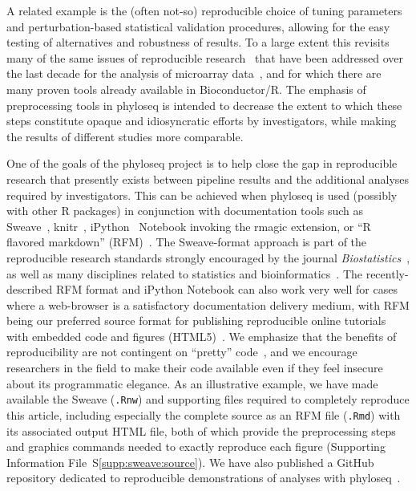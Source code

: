 \documentclass[10pt]{article}\usepackage{graphicx, color}
\newcommand{\R}{{\textsf{R}}}
\newcommand{\code}[1]{{\texttt{#1}}}
\begin{document}
A related example is the (often not-so) reproducible choice of tuning parameters
and perturbation-based statistical validation procedures,
allowing for the easy testing of alternatives and robustness of results.
To a large extent this revisits many of the same issues
of reproducible research~\cite{Donoho:2010cx,Peng:2009jy,Gentleman:2004vk} 
that have been addressed over the last decade
for the analysis of microarray data~\cite{Allison:2006fk},
and for which there are many proven tools already available in Bioconductor/\R{}. 
The emphasis of preprocessing tools in phyloseq
is intended to decrease the extent to which these steps constitute
opaque and idiosyncratic efforts by investigators,
while making the results of different studies more comparable.

One of the goals of the phyloseq project is to help close
the gap in reproducible research that presently exists
between pipeline results
and the additional analyses required by investigators.
This can be achieved when phyloseq is used
(possibly with other \R{} packages) 
in conjunction with documentation tools such as 
Sweave~\cite{Sweave},
knitr~\cite{knitr},
iPython~\cite{ipython} Notebook invoking the rmagic extension,
or ``\R{} flavored markdown'' (RFM)~\cite{Rmarkdown}.
The Sweave-format approach
is part of the reproducible research standards
strongly encouraged by the journal \emph{Biostatistics}~\cite{Peng:2009jy},
as well as many disciplines related to
statistics and bioinformatics~\cite{Carey:2010gq,Gentleman:2005jk}.
The recently-described RFM format and iPython Notebook
can also work very well
for cases where a web-browser is a satisfactory documentation delivery medium,
with RFM being our preferred source format for
publishing reproducible online tutorials
with embedded code and figures (HTML5)~\cite{phyloseq:demo,phyloseq:github}.
We emphasize that the benefits of reproducibility
are not contingent on ``pretty'' code~\cite{Barnes:2010dn},
and we encourage researchers in the field to
make their code available even if they feel
insecure about its programmatic elegance.
As an illustrative example, we have made available
the Sweave (\code{.Rnw}) and supporting files required
to completely reproduce this article,
including especially the complete source as an RFM file (\code{.Rmd})
with its associated output HTML file,
both of which provide the preprocessing steps and graphics commands needed 
to exactly reproduce each figure
(Supporting Information File~S\ref{supp:sweave:source}).
We have also published a GitHub repository dedicated to
reproducible demonstrations of analyses with phyloseq~\cite{phyloseq:demo}.
\end{document}
